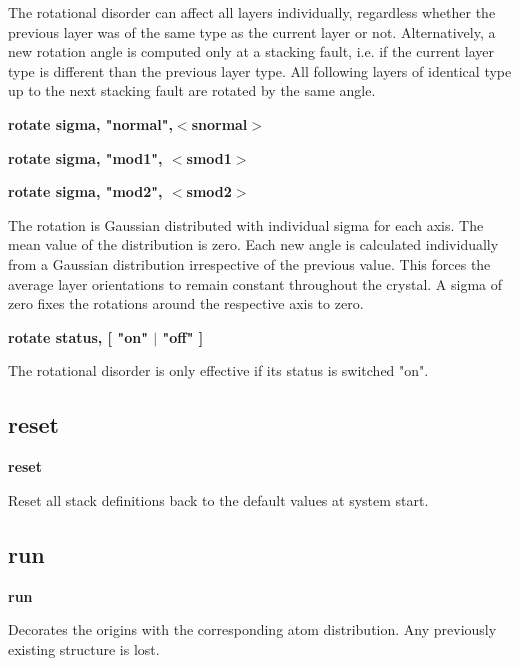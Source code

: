 \par
\vspace{3pt}
The rotational disorder can affect all layers individually, regardless 
whether the previous layer was of the same type as the current layer or 
not. 
Alternatively, a new rotation angle is computed only at a stacking fault, 
i.e. if the current layer type is different than the previous layer type. 
All following layers of identical type up to the next stacking fault are 
rotated by the same angle. 
\par
{\bf rotate sigma, "normal",$ <$snormal$> $ \par }
{\bf rotate sigma, "mod1",  $ <$smod1$> $ \par }
{\bf rotate sigma, "mod2",  $ <$smod2$> $ \par }
\par
\vspace{3pt}
The rotation is Gaussian distributed with individual sigma for each axis. 
The mean value of the distribution is zero. Each new angle is calculated 
individually from a Gaussian distribution irrespective of the previous 
value. This forces the average layer orientations to remain constant 
throughout the crystal. 
A sigma of zero fixes the rotations around the respective axis to zero. 
\par
{\bf rotate status,  [ "on" $| $ "off" ] \par }
\par
\vspace{3pt}
The rotational disorder is only effective if its status is switched "on". 
\subsection*{reset}
{\bf reset \par }
\par
\vspace{3pt}
Reset all stack definitions back to the default values at 
system start. 
\subsection*{run}
{\bf run \par }
\par
\vspace{3pt}
Decorates the origins with the corresponding atom distribution. Any 
previously existing structure is lost. 
